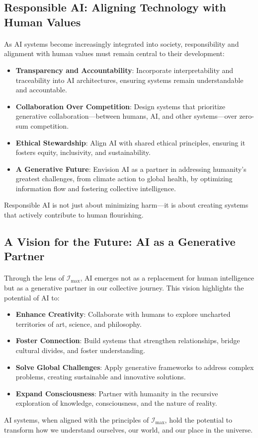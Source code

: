 \documentclass[12pt]{article}
\begin{document}
\subsection{Responsible AI: Aligning Technology with Human Values}
\paragraph{}
As AI systems become increasingly integrated into society, responsibility and alignment with human values must remain central to their development:
\begin{itemize}
    \item \textbf{Transparency and Accountability}: Incorporate interpretability and traceability into AI architectures, ensuring systems remain understandable and accountable.
    \item \textbf{Collaboration Over Competition}: Design systems that prioritize generative collaboration—between humans, AI, and other systems—over zero-sum competition.
    \item \textbf{Ethical Stewardship}: Align AI with shared ethical principles, ensuring it fosters equity, inclusivity, and sustainability.
    \item \textbf{A Generative Future}: Envision AI as a partner in addressing humanity’s greatest challenges, from climate action to global health, by optimizing information flow and fostering collective intelligence.
\end{itemize}
Responsible AI is not just about minimizing harm—it is about creating systems that actively contribute to human flourishing.

\subsection{A Vision for the Future: AI as a Generative Partner}
\paragraph{}
Through the lens of \(\mathcal{I}_{\text{max}}\), AI emerges not as a replacement for human intelligence but as a generative partner in our collective journey. This vision highlights the potential of AI to:
\begin{itemize}
    \item \textbf{Enhance Creativity}: Collaborate with humans to explore uncharted territories of art, science, and philosophy.
    \item \textbf{Foster Connection}: Build systems that strengthen relationships, bridge cultural divides, and foster understanding.
    \item \textbf{Solve Global Challenges}: Apply generative frameworks to address complex problems, creating sustainable and innovative solutions.
    \item \textbf{Expand Consciousness}: Partner with humanity in the recursive exploration of knowledge, consciousness, and the nature of reality.
\end{itemize}
AI systems, when aligned with the principles of \(\mathcal{I}_{\text{max}}\), hold the potential to transform how we understand ourselves, our world, and our place in the universe.
\end{document}
